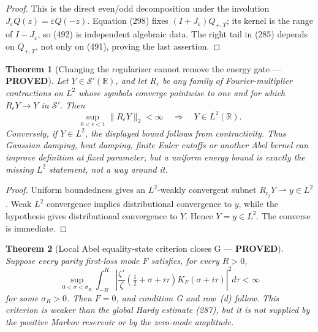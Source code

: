\documentclass[11pt]{article}
\newtheorem{theorem}{Theorem}
\newcommand{\PROVED}{\textcolor{green!45!black}{\textbf{PROVED}}}
\begin{document}
\begin{proof}
This is the direct even/odd decomposition under the involution
\(J_\varepsilon Q(z)=\varepsilon Q(-z)\).  Equation (298) fixes
\((I+J_\varepsilon)Q_{+,T}\); its kernel is the range of
\(I-J_\varepsilon\), so (492) is independent algebraic data.  The right
tail in (285) depends on \(Q_{+,T}\), not only on (491), proving the last
assertion.
\end{proof}

\begin{theorem}[Changing the regularizer cannot remove the energy gate ---
\PROVED]
Let \(Y\in\mathcal S'(\mathbb R)\), and let \(R_\epsilon\) be any family of
Fourier-multiplier contractions on \(L^2\) whose symbols converge pointwise
to one and for which \(R_\epsilon Y\to Y\) in \(\mathcal S'\).  Then
\begin{equation}
 \sup_{0<\epsilon<1}\|R_\epsilon Y\|_2<\infty
 \quad\Longrightarrow\quad Y\in L^2(\mathbb R).     \tag{493}
\end{equation}
Conversely, if \(Y\in L^2\), the displayed bound follows from contractivity.
Thus Gaussian damping, heat damping, finite Euler cutoffs or another Abel
kernel can improve definition at fixed parameter, but a uniform energy
bound is exactly the missing \(L^2\) statement, not a way around it.
\end{theorem}

\begin{proof}
Uniform boundedness gives an \(L^2\)-weakly convergent subnet
\(R_{\epsilon_j}Y\rightharpoonup y\in L^2\).  Weak \(L^2\) convergence
implies distributional convergence to \(y\), while the hypothesis gives
distributional convergence to \(Y\).  Hence \(Y=y\in L^2\).  The converse
is immediate.
\end{proof}

\begin{theorem}[Local Abel equality-state criterion closes G --- \PROVED]
Suppose every parity first-loss mode \(F\) satisfies, for every \(R>0\),
\begin{equation}
 \sup_{0<\sigma<\sigma_R}
 \int_{-R}^{R}
 \left|\frac{\zeta'}{\zeta}
 (\tfrac12+\sigma+i\tau)K_F(\sigma+i\tau)\right|^2d\tau<\infty          \tag{494}
\end{equation}
for some \(\sigma_R>0\).  Then \(F=0\), and condition G and row~(d) follow.
This criterion is weaker than the global Hardy estimate (287), but it is not
supplied by the positive Markov reservoir or by the zero-mode amplitude.
\end{theorem}
\end{document}

